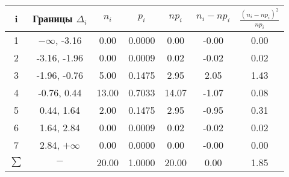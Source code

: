 \begin{tabular}{|c|c|c|c|c|c|c|}
\hline
\hline i & Границы $\Delta_i$ & $n_i$ & $p_i$ & $np_i$ & $n_i - np_i$ & $\frac{(n_i - np_i)^2}{np_i}$\\
\hline
1 & $-\infty$, -3.16 & 0.00 & 0.0000 & 0.00 & -0.00 & 0.00\\
\hline
2 & -3.16, -1.96 & 0.00 & 0.0009 & 0.02 & -0.02 & 0.02\\
\hline
3 & -1.96, -0.76 & 5.00 & 0.1475 & 2.95 & 2.05 & 1.43\\
\hline
4 & -0.76, 0.44 & 13.00 & 0.7033 & 14.07 & -1.07 & 0.08\\
\hline
5 & 0.44, 1.64 & 2.00 & 0.1475 & 2.95 & -0.95 & 0.31\\
\hline
6 & 1.64, 2.84 & 0.00 & 0.0009 & 0.02 & -0.02 & 0.02\\
\hline
7 & 2.84, $+\infty$ & 0.00 & 0.0000 & 0.00 & -0.00 & 0.00\\
\hline
$\sum$ & $-$ & 20.00 & 1.0000 & 20.00 & 0.00 & 1.85\\
\hline
\end{tabular}
